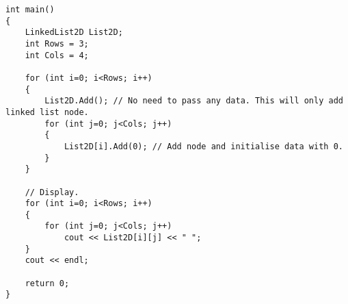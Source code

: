 \documentclass[12pt,a4paper]{article}
\begin{document}
\begin{enumerate}
\begin{lstlisting}[caption={2D Linked List Concept and Usage}]
int main()
{
	LinkedList2D List2D;
	int Rows = 3;
	int Cols = 4;

	for (int i=0; i<Rows; i++)
	{
		List2D.Add(); // No need to pass any data. This will only add linked list node.
		for (int j=0; j<Cols; j++)
		{
			List2D[i].Add(0); // Add node and initialise data with 0.
		}
	}

	// Display.
	for (int i=0; i<Rows; i++)
	{
		for (int j=0; j<Cols; j++)
			cout << List2D[i][j] << " ";
	}
	cout << endl;

	return 0;
}
\end{lstlisting}
\end{enumerate}
\end{document}
